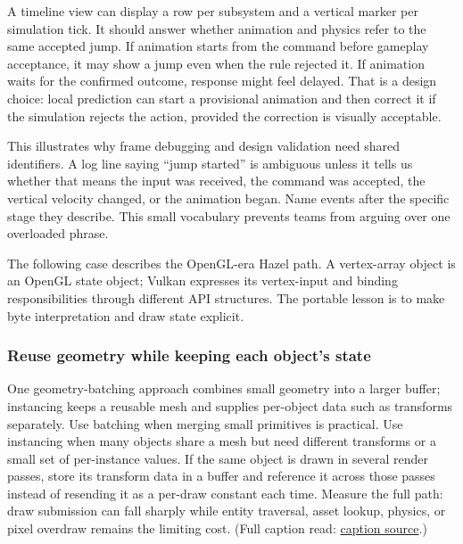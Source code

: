 A timeline view can display a row per subsystem and a vertical marker per simulation tick. It should answer whether animation and physics refer to the same accepted jump. If animation starts from the command before gameplay acceptance, it may show a jump even when the rule rejected it. If animation waits for the confirmed outcome, response might feel delayed. That is a design choice: local prediction can start a provisional animation and then correct it if the simulation rejects the action, provided the correction is visually acceptable.

This illustrates why frame debugging and design validation need shared identifiers. A log line saying ``jump started'' is ambiguous unless it tells us whether that means the input was received, the command was accepted, the vertical velocity changed, or the animation began. Name events after the specific stage they describe. This small vocabulary prevents teams from arguing over one overloaded phrase.

The following case describes the OpenGL-era Hazel path. A vertex-array object is an OpenGL state object; Vulkan expresses its vertex-input and binding responsibilities through different API structures. The portable lesson is to make byte interpretation and draw state explicit.

\subsubsection{Reuse geometry while keeping each object's state}\label{06-engine-ii-ch026-reuse-geometry-while-keeping-each-objects-state}

\hypertarget{06-engine-ii-ch026-reuse-geometry-while-keeping-each-objects-state}{}

One geometry-batching approach combines small geometry into a larger buffer; instancing keeps a reusable mesh and supplies per-object data such as transforms separately. Use batching when merging small primitives is practical. Use instancing when many objects share a mesh but need different transforms or a small set of per-instance values. If the same object is drawn in several render passes, store its transform data in a buffer and reference it across those passes instead of resending it as a per-draw constant each time. Measure the full path: draw submission can fall sharply while entity traversal, asset lookup, physics, or pixel overdraw remains the limiting cost. (Full caption read: \href{https://www.youtube.com/watch?v=81uFrHwhQg4}{caption source}.)

